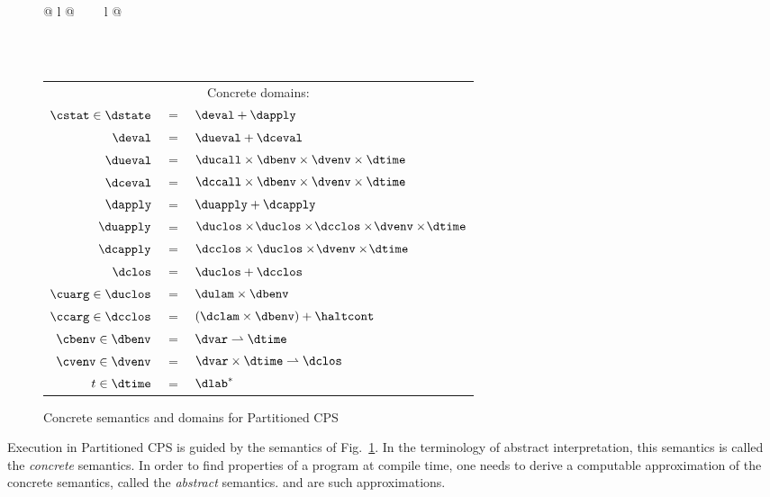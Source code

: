 \documentclass{LMCS}
\theoremstyle{definition} \newtheorem{property}[thm]{Property}
\begin{document}
\begin{figure}[!t]
{\begin{tabular}{@{} l @{$\qquad$} l @{}}
{{        }
        \\ \\
        \begin{tabular}{@{} r @{\;} c @{\;} l @{}}
          \multicolumn{3}{c}{\hspace*{\stretch{1}}
            Concrete domains:\hspace*{\stretch{6}}} \rule{0cm}{0.4cm} \\
          $\cstat \in \dstate$ & $=$  & $\deval + \dapply$ 
          \rule{0cm}{0.4cm} \\ 
          $\deval$ & $=$  & $\dueval + \dceval$ \\
          $\dueval$ & $=$  & $\ducall \times \dbenv \times \dvenv
          \times \dtime$ \\
          $\dceval$ & $=$  & $\dccall \times \dbenv \times \dvenv
          \times \dtime$  \\
          $\dapply$ & $=$  & $\duapply + \dcapply$ \\
          $\duapply$ & $=$  & 
          $\duclos \times \!\duclos \times \!\dcclos \times \!\dvenv 
          \times \!\dtime$ \\
          $\dcapply$ & $=$ & 
          $\dcclos \times  \duclos \times \!\dvenv \times \!\dtime$ \\
          $\dclos$ & $=$ & $\duclos + \dcclos$ \\
          $\cuarg \in \duclos$ & $=$ & $\dulam \times \dbenv$ \\
          $\ccarg \in \dcclos$ & $=$  & $(\dclam \times \dbenv) + \haltcont$ \\
          $\cbenv \in \dbenv$ & $=$  & $\dvar \rightharpoonup \dtime$ \\
          $\cvenv \in \dvenv$ & $=$  & 
          $\dvar \times \dtime \rightharpoonup \dclos$\\
          $t \in \dtime$ & $=$  & $\dlab^*$ 
        \end{tabular}
      }
    \end{tabular}
  }
\caption{Concrete semantics and domains for Partitioned CPS\label{fig:concsems}}
\end{figure}

\noindent Execution in Partitioned CPS is guided by the semantics of 
Fig.~\ref{fig:concsems}.
In the terminology of abstract interpretation, this semantics is called the
\emph{concrete} semantics.
In order to find properties of a program at compile time, one needs to derive a
computable approximation of the concrete semantics, called the \emph{abstract}
semantics.
\cfat{} and \kcfa{} are such approximations.
\end{document}
